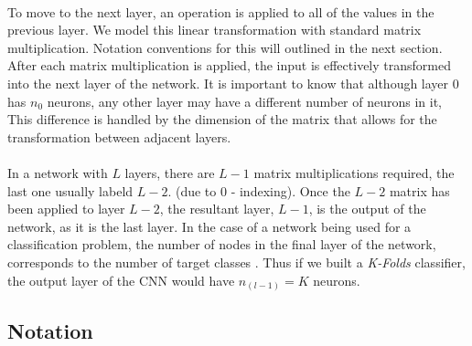 \documentclass[12pt,letterpaper]{article}
\begin{document}
\paragraph*{}To move to the next layer, an operation is applied to all of the values in the previous layer. We model this linear transformation with standard matrix multiplication. Notation conventions for this will outlined in the next section. After each matrix multiplication is applied, the input is effectively transformed into the next layer of the network. It is important to know that although layer 0 has $n_0$ neurons, any other layer may have a different number of neurons in it, This difference is handled by the dimension of the matrix that allows for the transformation between adjacent layers.
\paragraph*{}In a network with $L$ layers, there are $L-1$ matrix multiplications required, the last one usually labeld $L-2$. (due to $0$ - indexing). Once the $L-2$ matrix has been applied to layer $L-2$, the resultant layer, $L-1$, is the output of the network, as it is the last layer. In the case of a network being used for a classification problem, the number of nodes in the final layer of the network, corresponds to the number of target classes \cite{Geron}. Thus if we built a \textit{K-Folds} classifier, the output layer of the CNN would have $n_{(l-1)} = K$ neurons.


\subsection{Notation}
\end{document}
